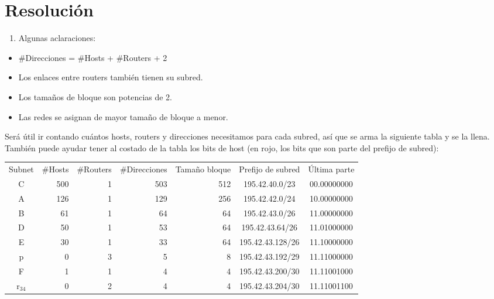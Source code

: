 \section*{Resolución}

\noindent
\begin{enumerate}[left=0cm]
\item Algunas aclaraciones:
\end{enumerate}

\begin{itemize}
\item \#Direcciones = \#Hosts + \#Routers + 2
\item Los enlaces entre routers también tienen su subred.
\item Los tamaños de bloque son potencias de 2.
\item Las redes se asignan de mayor tamaño de bloque a menor.
\end{itemize}

Será útil ir contando cuántos hosts, routers y direcciones necesitamos para cada subred, así que se arma la siguiente tabla y se la llena. También puede ayudar tener al costado de la tabla los bits de host (en rojo, los bits que son parte del prefijo de subred):

\begin{table}[H]
    \centering
    \begin{tabular}{|c|r|r|r|r|c|c}
    \cline{1-6}
    \multicolumn{1}{|c|}{Subnet} & \multicolumn{1}{c|}{\#Hosts} & \multicolumn{1}{c|}{\#Routers} & \multicolumn{1}{c|}{\#Direcciones} & \multicolumn{1}{c|}{Tamaño bloque} & \multicolumn{1}{c|}{Prefijo de subred} & Última parte\\ \cline{1-6}
    C & 500 & 1 & 503 & 512 & 195.42.40.0/23 & {\color{red}0}0.00000000\\ \cline{1-6}
    A & 126 & 1 & 129 & 256 & 195.42.42.0/24 & {\color{red}10}.00000000\\ \cline{1-6}
    B & 61 & 1 & 64 & 64 & 195.42.43.0/26 & {\color{red}11.00}000000\\ \cline{1-6}
    D & 50 & 1 & 53 & 64 & 195.42.43.64/26 & {\color{red}11.01}000000\\ \cline{1-6}
    E & 30 & 1 & 33 & 64 & 195.42.43.128/26 & {\color{red}11.10}000000\\ \cline{1-6}
    p & 0 & 3 & 5 & 8 & 195.42.43.192/29 & {\color{red}11.11000}000\\ \cline{1-6}
    F & 1 & 1 & 4 & 4 & 195.42.43.200/30 & {\color{red}11.110010}00\\ \cline{1-6}
    $\text{r}_{34}$ & 0 & 2 & 4 & 4 & 195.42.43.204/30 & {\color{red}11.110011}00\\\cline{1-6}
    \end{tabular}
\end{table}

